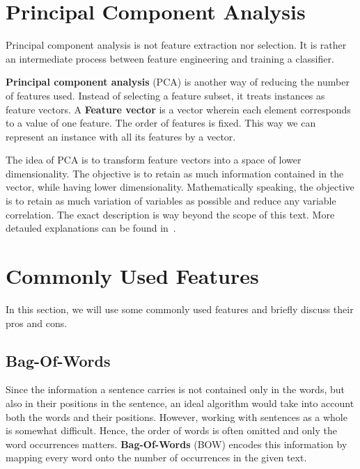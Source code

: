 
\section{Principal Component Analysis}

Principal component analysis is not feature extraction nor selection.
It is rather an intermediate process between feature engineering and training a classifier.

\textbf{Principal component analysis} (PCA) is another way of reducing the number of features used.
Instead of selecting a feature subset, it treats instances as feature vectors.
A \textbf{Feature vector} is a vector wherein each element corresponds to a value of one feature.
The order of features is fixed.
This way we can represent an instance with all its features by a vector.

The idea of PCA is to transform feature vectors into a space of lower dimensionality.
The objective is to retain as much information contained in the vector, while
having lower dimensionality.
Mathematically speaking, the objective is to retain as much variation of variables
as possible and reduce any variable correlation.
The exact description is way beyond the scope of this text.
More detauled explanations can be found in~\citet{Jolliffe02}.

\section{Commonly Used Features}

In this section, we will use some commonly used features and briefly discuss their pros and cons.

\subsection{Bag-Of-Words}
\label{subsec:bow}

Since the information a sentence carries is not contained only in the words, but also in their positions in the sentence, an ideal algorithm would take into account both the words and their positions.
However, working with sentences as a whole is somewhat difficult. Hence, the order of words is often omitted and only the word occurrences matters.
\textbf{Bag-Of-Words} (BOW) encodes this information by mapping every word onto the number of occurrences in the given text.

